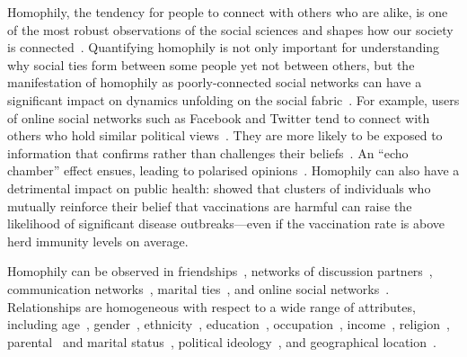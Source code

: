 \documentclass{scrartcl}
\begin{document}
Homophily, the tendency for people to connect with others who are alike, is one of the most robust observations of the social sciences and shapes how our society is connected~\cite{McPherson2001}.
Quantifying homophily is not only important for understanding why social ties form between some people yet not between others, but the manifestation of homophily as poorly-connected social networks can have a significant impact on dynamics unfolding on the social fabric~\cite{Golub2012}. For example, users of online social networks such as Facebook and Twitter tend to connect with others who hold similar political views~\cite{Boutyline2017}. They are more likely to be exposed to information that confirms rather than challenges their beliefs~\cite{Bakshy2015}. An ``echo chamber'' effect ensues, leading to polarised opinions~\cite{DeMarzo2003}. Homophily can also have a detrimental impact on public health: \textcite{Salathe2008} showed that clusters of individuals who mutually reinforce their belief that vaccinations are harmful can raise the likelihood of significant disease outbreaks---even if the vaccination rate is above herd immunity levels on average.

Homophily can be observed in friendships~\cite{Currarini2009, Hipp2009}, networks of discussion partners~\cite{McPherson2006}, communication networks~\cite{Wang2013, Leo2016}, marital ties~\cite{Blau1984}, and online social networks~\cite{Chang2010}. Relationships are homogeneous with respect to a wide range of attributes, including age~\cite{Marsden1988,Smith2014}, gender~\cite{Stehle2011,Smith2014}, ethnicity~\cite{Chang2010, Blumenstock2013, Currarini2009}, education~\cite{McPherson2006, Smith2014,Johnson1989}, occupation~\cite{Chan2004}, income~\cite{Leo2016, Wang2013, Johnson1989}, religion~\cite{Platt2012}, parental~\cite{Johnson1989} and marital status~\cite{Kalmijn2007}, political ideology~\cite{Bakshy2015, Boutyline2017}, and geographical location~\cite{Lambiotte2008, Expert2011, Backstrom2010, Scellato2011, Illenberger2013}. %
\end{document}
